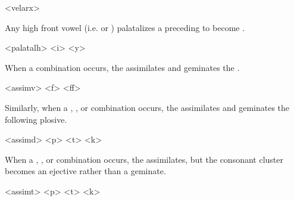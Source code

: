 \ex<velarx>
	   
\xe

Any high front vowel (i.e.  or ) palatalizes a preceding  to become .

\pex<palatalh>
	    
	    
\xe

When a  combination occurs, the  assimilates and geminates the .

\pex<assimv>
	    
	\a<ff>    
\xe

Similarly, when a , , or  combination occurs, the  assimilates and geminates the following plosive.

\pex<assimd>
	    
	    
	    
\xe

When a , , or  combination occurs, the  assimilates, but the consonant cluster becomes an ejective rather than a geminate.

\pex<assimt>
	    
	    
	    
\xe


